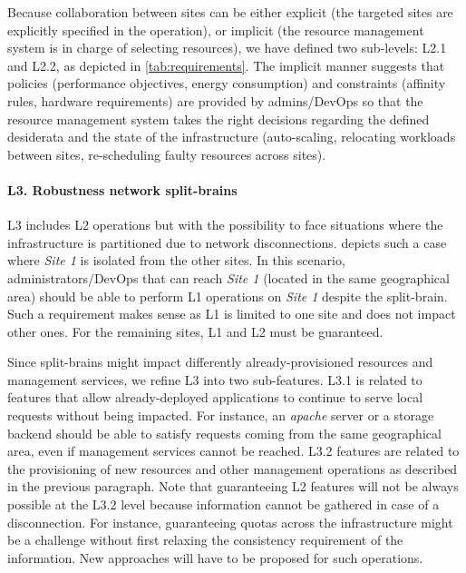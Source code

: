 Because collaboration between sites can be either explicit (\ie the
targeted sites are explicitly specified in the operation), or implicit
(\ie the resource management system is in charge of selecting
resources), we have defined two sub-levels: L2.1 and L2.2, as depicted in
\cref{tab:requirements}.
The implicit
manner suggests that policies (\eg performance objectives, energy
consumption) and constraints (\eg affinity rules, hardware requirements) are
provided by admins/DevOps so that the resource management system takes the
right decisions regarding the defined desiderata and the state of the
infrastructure (\eg auto-scaling, relocating workloads between sites,
re-scheduling faulty resources across sites).

\paragraph{L3. Robustness \wrt network split-brains}
L3 includes L2 operations but with the possibility to face situations
where the infrastructure is partitioned due to network disconnections.
%
 depicts such a case where \emph{Site 1} is isolated
from the other sites. In this scenario, administrators/DevOps that can reach \emph{Site
1} (\ie located in the same geographical area) should be able to perform L1
operations on \emph{Site 1} despite the split-brain. Such a requirement
makes sense as L1 is limited to one site and does not impact other ones.
%
For the remaining sites, L1
and L2 must be guaranteed.

Since split-brains might impact differently already-provisioned resources and
management services, we refine L3 into two sub-features. L3.1 is
related to features that allow already-deployed applications to continue to
serve local requests without being impacted. For instance, an \emph{apache}
server or a storage backend should be able to satisfy requests coming from the
same geographical area, even if management services cannot be reached. L3.2
features are related to the provisioning of new resources and other management
operations as described in the previous paragraph.
%
Note that guaranteeing L2 features will not be always possible at the L3.2
level because information cannot be gathered in case of a disconnection. For
instance, guaranteeing quotas across the infrastructure might be a challenge %
without first relaxing the consistency requirement of the information. New approaches will have
to be proposed for such operations.


